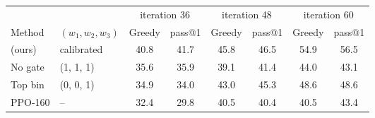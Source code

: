 \begin{tabular}{l l c c c c c c }
\toprule
 & & \multicolumn{2}{c}{iteration 36} & \multicolumn{2}{c}{iteration 48} & \multicolumn{2}{c}{iteration 60} \\
\cmidrule(lr){3-4}\cmidrule(lr){5-6}\cmidrule(lr){7-8}
Method & $(w_1, w_2, w_3)$ & Greedy & pass@1 & Greedy & pass@1 & Greedy & pass@1 \\
\midrule
\wmppo{} (ours) & calibrated & 40.8 & 41.7 & 45.8 & 46.5 & 54.9 & 56.5 \\
No gate & (1, 1, 1) & 35.6\sigup{} & 35.9\sigup{} & 39.1\sigup{} & 41.4\sigup{} & 44.0\sigup{} & 43.1\sigup{} \\
Top bin & (0, 0, 1) & 34.9\sigup{} & 34.0\sigup{} & 43.0 & 45.3 & 48.6\sigup{} & 48.6\sigup{} \\
PPO-160 & -- & 32.4\sigup{} & 29.8\sigup{} & 40.5\sigup{} & 40.4\sigup{} & 40.5\sigup{} & 43.4\sigup{} \\
\bottomrule
\end{tabular}

